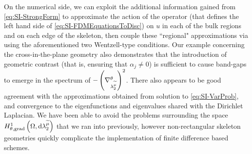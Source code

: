 On the numerical side, we can exploit the additional information gained from \eqref{eq:SI-StrongForm} to approximate the action of the operator (that defines the left hand side of \eqref{eq:SI-FDMEquationsToDisc}) on $u$ in each of the bulk regions and on each edge of the skeleton, then couple these ``regional" approximations via using the aforementioned two Wentzell-type conditions.
Our example concerning the cross-in-the-plane geometry also demonstrates that the introduction of geometric contrast (that is, ensuring that $\alpha_j\neq0$) is sufficient to cause band-gaps to emerge in the spectrum of $-\left( \nabla^{\theta}_{\lambda_2^{\widetilde{\mu}}} \right)^2$.
There also appears to be good agreement with the approximations obtained from solution to \eqref{eq:SI-VarProb}, and convergence to the eigenfunctions and eigenvalues shared with the Dirichlet Laplacian.
We have been able to avoid the problems surrounding the space $H^1_{\theta, \mathrm{grad}}\left( \Omega, \mathrm{d}\lambda_2^{\widetilde{\mu}} \right)$ that we ran into previously, however non-rectangular skeleton geometries quickly complicate the implementation of finite difference based schemes.

